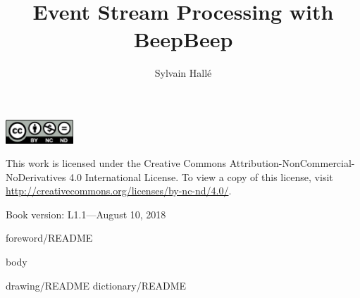\documentclass{lifmanual}
\title{Event Stream Processing with BeepBeep}
\author{Sylvain Hallé}
\begin{document}
\frontmatter

\newpage

\cleardoublepage

\newpage

\thispagestyle{empty}
\pagestyle{empty}
\rule{0in}{6in}
\noindent
\includegraphics[width=1in]{by-nc-nd}\\
{\sf\small
\noindent
This work is licensed under the Creative Commons Attribution-NonCommercial-NoDerivatives 4.0 International License. To view a copy of this license, visit \url{http://creativecommons.org/licenses/by-nc-nd/4.0/}.\\

\noindent
\rule{0in}{8pt}
\noindent
Book version: L1.1---August 10, 2018}


\pagestyle{toc}
\tableofcontents
\newpage
{foreword/README}

\mainmatter
\thispagestyle{normal}
\pagestyle{normal}

{body}

\appendix
\renewcommand{\chaptername}{Appendix}
{drawing/README}
{dictionary/README}

\pagestyle{index}
\printindex

\cleardoublepage
\thispagestyle{empty}
\phantom{W}
\newpage

\end{document}
